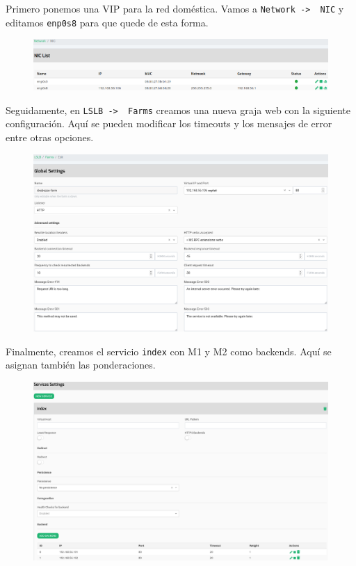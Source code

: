 \documentclass{article}
\begin{document}
Primero ponemos una VIP para la red doméstica. Vamos a \texttt{Network -> \ NIC} y editamos \texttt{enp0s8} para que
quede de esta forma.

\begin{figure}[H]
	\centering
	\includegraphics[width=160mm]{imgs/zev-nic}
\end{figure}

Seguidamente, en \texttt{LSLB -> \ Farms} creamos una nueva graja web con la siguiente configuración.
Aquí se pueden modificar los timeouts y los mensajes de error entre otras opciones.

\begin{figure}[H]
	\centering
	\includegraphics[width=160mm]{imgs/zev-farm}
\end{figure}

Finalmente, creamos
el servicio \texttt{index} con M1 y M2 como backends. Aquí se asignan también las ponderaciones.

\begin{figure}[H]
	\centering
	\includegraphics[width=160mm]{imgs/zev-service}
\end{figure}
\end{document}
